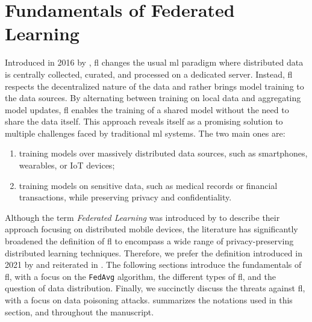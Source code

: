 \section{Fundamentals of Federated Learning\label{sec:bg.fl}}

Introduced in 2016 by \textcite{mcmahan_Communicationefficientlearningdeep_2017}, \acrfull{fl} changes the usual \gls{ml} paradigm where distributed data is centrally collected, curated, and processed on a dedicated server. 
Instead, \gls{fl} respects the decentralized nature of the data and rather brings model training to the data sources.
By alternating between training on local data and aggregating model updates, \gls{fl} enables the training of a shared model without the need to share the data itself.
This approach reveals itself as a promising solution to multiple challenges faced by traditional \gls{ml} systems.
The two main ones are:
\begin{enumerate}
    \item training models over massively distributed data sources, such as smartphones, wearables, or IoT devices;
    \item training models on sensitive data, such as medical records or financial transactions, while preserving privacy and confidentiality.
\end{enumerate}

Although the term \emph{Federated Learning} was introduced by \textcite{mcmahan_Communicationefficientlearningdeep_2017} to describe their approach focusing on distributed mobile devices, the literature has significantly broadened the definition of \gls{fl} to encompass a wide range of privacy-preserving distributed learning techniques.
Therefore, we prefer the definition introduced in 2021 by \textcite{kairouz_AdvancesOpenProblems_2021} and reiterated in .
The following sections introduce the fundamentals of \gls{fl}, with a focus on the \texttt{FedAvg} algorithm, the different types of \gls{fl}, and the question of data distribution.
Finally, we succinctly discuss the threats against \gls{fl}, with a focus on data poisoning attacks.
 summarizes the notations used in this section, and throughout the manuscript.

